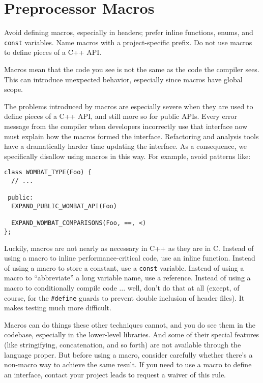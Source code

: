 
\section{Preprocessor Macros}\label{sec:preprocessor-macros}
Avoid defining macros, especially in headers; prefer inline functions, enums, and \texttt{const} variables. Name macros with a project-specific prefix. Do not use macros to define pieces of a C++ API.

Macros mean that the code you see is not the same as the code the compiler sees. This can introduce unexpected behavior, especially since macros have global scope.

The problems introduced by macros are especially severe when they are used to define pieces of a C++ API, and still more so for public APIs. Every error message from the compiler when developers incorrectly use that interface now must explain how the macros formed the interface. Refactoring and analysis tools have a dramatically harder time updating the interface. As a consequence, we specifically disallow using macros in this way. For example, avoid patterns like:
\begin{verbatim}
class WOMBAT_TYPE(Foo) {
  // ...

 public:
  EXPAND_PUBLIC_WOMBAT_API(Foo)

  EXPAND_WOMBAT_COMPARISONS(Foo, ==, <)
};
\end{verbatim}
Luckily, macros are not nearly as necessary in C++ as they are in C. Instead of using a macro to inline performance-critical code, use an inline function. Instead of using a macro to store a constant, use a \texttt{const} variable. Instead of using a macro to \enquote{abbreviate} a long variable name, use a reference. Instead of using a macro to conditionally compile code ... well, don't do that at all (except, of course, for the \texttt{#define} guards to prevent double inclusion of header files). It makes testing much more difficult.

Macros can do things these other techniques cannot, and you do see them in the codebase, especially in the lower-level libraries. And some of their special features (like stringifying, concatenation, and so forth) are not available through the language proper. But before using a macro, consider carefully whether there's a non-macro way to achieve the same result. If you need to use a macro to define an interface, contact your project leads to request a waiver of this rule.

